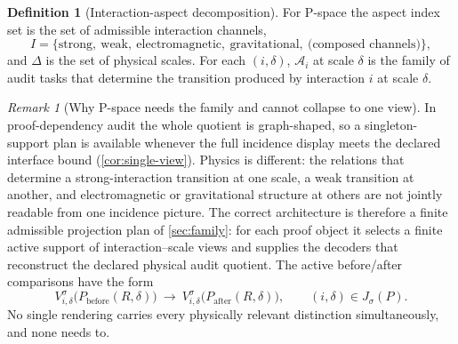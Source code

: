 \documentclass[11pt]{article}
\newcommand{\mcA}{\mathcal A}
\theoremstyle{plain}
\theoremstyle{definition}
\newtheorem{definition}[theorem]{Definition}
\theoremstyle{remark}
\newtheorem{remark}[theorem]{Remark}
\begin{document}
\begin{definition}[Interaction-aspect decomposition]
\label{def:interaction-aspects}
For P-space the aspect index set is the set of admissible interaction channels,
\[
  I=\{\text{strong},\ \text{weak},\ \text{electromagnetic},\ \text{gravitational},\ \text{(composed channels)}\},
\]
and $\Delta$ is the set of physical scales.  For each $(i,\delta)$, $\mcA_i$ at scale $\delta$ is the family of audit tasks that determine the transition produced by interaction $i$ at scale $\delta$.
\end{definition}

\begin{remark}[Why P-space needs the family and cannot collapse to one view]
\label{rem:pspace-family}
In proof-dependency audit the whole quotient is graph-shaped, so a
singleton-support plan is available whenever the full incidence display meets
the declared interface bound (\cref{cor:single-view}).  Physics is different:
the relations that determine a strong-interaction transition at one scale, a
weak transition at another, and electromagnetic or gravitational structure at
others are not jointly readable from one incidence picture.  The correct
architecture is therefore a finite admissible projection plan of
\cref{sec:family}: for each proof object it selects a finite active support of
interaction--scale views and supplies the decoders that reconstruct the declared
physical audit quotient.  The active before/after comparisons have the form
\[
  V^\sigma_{i,\delta}\bigl(P_{\text{before}}(R,\delta)\bigr)
  \ \longrightarrow\
  V^\sigma_{i,\delta}\bigl(P_{\text{after}}(R,\delta)\bigr),
  \qquad (i,\delta)\in J_\sigma(P).
\]
No single rendering carries every physically relevant distinction
simultaneously, and none needs to.
\end{remark}
\end{document}
